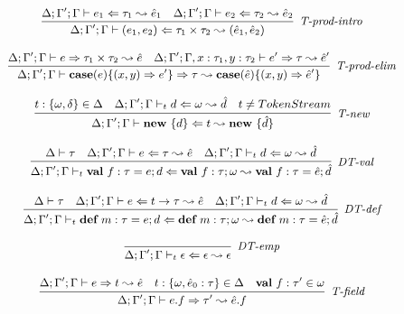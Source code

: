 \begin{figure}
\centering
\[
\footnotesize
\begin{array}{c}
\infer[\textit{T-prod-intro}]
	{\Delta; \Gamma'; \Gamma \vdash (e_1, e_2) \Leftarrow \tau_1 \times \tau_2 \leadsto (\hat{e}_1, \hat{e}_2)}
	{\Delta; \Gamma'; \Gamma \vdash e_1 \Leftarrow \tau_1 \leadsto \hat{e}_1 & 
	 \Delta; \Gamma'; \Gamma \vdash e_2 \Leftarrow \tau_2 \leadsto \hat{e}_2}
	 \\[3ex]
\infer[\textit{T-prod-elim}]
	{\Delta; \Gamma'; \Gamma \vdash \keyw{case}(e) \{ (x, y) \Rightarrow e' \} \Rightarrow \tau \leadsto \keyw{case}(\hat{e}) \{ (x, y) \Rightarrow \hat{e}' \}}
	{\Delta; \Gamma'; \Gamma \vdash e \Rightarrow \tau_1 \times \tau_2 \leadsto \hat{e} & 
	 \Delta; \Gamma'; \Gamma, x : \tau_1, y : \tau_2 \vdash e' \Rightarrow \tau \leadsto \hat{e}'}
	\\[3ex]
\infer[\textit{T-new}]
	{\Delta; \Gamma'; \Gamma \vdash \keyw{new}\ \{ d \} \Leftarrow  t \leadsto \keyw{new}\ \{\hat d\}}
	{ t:\{\omega, \delta\} \in \Delta & \Delta; \Gamma'; \Gamma \vdash_t d \Leftarrow \omega \leadsto \hat d & t\neq TokenStream} \\[3ex]

\infer[\textit{DT-val}]
	{\Delta; \Gamma'; \Gamma \vdash_t \keyw{val}~ f:\tau = e; d \Leftarrow \keyw{val}~ f:\tau; \omega \leadsto \keyw{val}~ f:\tau = \hat{e}; \hat{d}}
	{\Delta \vdash \tau &\Delta; \Gamma'; \Gamma \vdash e \Leftarrow \tau \leadsto \hat{e} & \Delta; \Gamma'; \Gamma \vdash_t d \Leftarrow \omega \leadsto \hat d} \\[3ex]
	
\infer[\textit{DT-def}]
	{\Delta; \Gamma'; \Gamma \vdash_t \keyw{def}~ m:\tau = e; d \Leftarrow \keyw{def}~ m:\tau; \omega \leadsto \keyw{def}~ m:\tau = \hat{e}; \hat{d} }
	{\Delta \vdash \tau  & \Delta; \Gamma'; \Gamma \vdash e  \Leftarrow t \rightarrow \tau \leadsto \hat{e} & \Delta; \Gamma'; \Gamma \vdash_t d \Leftarrow \omega \leadsto \hat d } \\[3ex]

\infer[\textit{DT-emp}]
	{\Delta; \Gamma'; \Gamma \vdash_t \epsilon \Leftarrow \epsilon \leadsto \epsilon}
	{ }\\[3ex]

\infer[\textit{T-field}]
	{\Delta; \Gamma'; \Gamma \vdash  e.f \Rightarrow \tau' \leadsto \hat{e}.f} 
	{\Delta; \Gamma'; \Gamma \vdash e \Rightarrow t \leadsto \hat{e} & t:\{\omega, \hat{e}_0:\tau\}\in \Delta & \keyw{val}\ f:\tau' \in \omega  }\\[3ex]


\end{array}\]
\end{figure}
